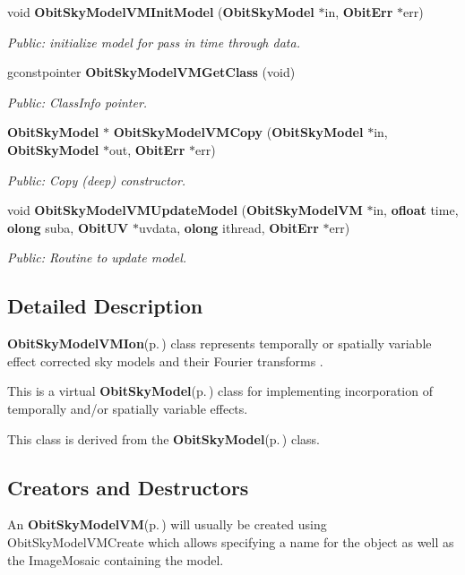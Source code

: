 \begin{CompactItemize}
void {\bf Obit\-Sky\-Model\-VMInit\-Model} ({\bf Obit\-Sky\-Model} $\ast$in, {\bf Obit\-Err} $\ast$err)
\begin{CompactList}\small\item\em Public: initialize model for pass in time through data. \item\end{CompactList}\item 
gconstpointer {\bf Obit\-Sky\-Model\-VMGet\-Class} (void)
\begin{CompactList}\small\item\em Public: Class\-Info pointer. \item\end{CompactList}\item 
{\bf Obit\-Sky\-Model} $\ast$ {\bf Obit\-Sky\-Model\-VMCopy} ({\bf Obit\-Sky\-Model} $\ast$in, {\bf Obit\-Sky\-Model} $\ast$out, {\bf Obit\-Err} $\ast$err)
\begin{CompactList}\small\item\em Public: Copy (deep) constructor. \item\end{CompactList}\item 
void {\bf Obit\-Sky\-Model\-VMUpdate\-Model} ({\bf Obit\-Sky\-Model\-VM} $\ast$in, {\bf ofloat} time, {\bf olong} suba, {\bf Obit\-UV} $\ast$uvdata, {\bf olong} ithread, {\bf Obit\-Err} $\ast$err)
\begin{CompactList}\small\item\em Public: Routine to update model. \item\end{CompactList}\end{CompactItemize}


\subsection{Detailed Description}
{\bf Obit\-Sky\-Model\-VMIon}{\rm (p.\,\pageref{structObitSkyModelVMIon})} class represents temporally or spatially variable effect corrected sky models and their Fourier transforms . 

This is a virtual {\bf Obit\-Sky\-Model}{\rm (p.\,\pageref{structObitSkyModel})} class for implementing incorporation of temporally and/or spatially variable effects.

This class is derived from the {\bf Obit\-Sky\-Model}{\rm (p.\,\pageref{structObitSkyModel})} class.\subsection{Creators and Destructors}\label{ObitSkyModelVM_8h_ObitSkyModelVMaccess}
An {\bf Obit\-Sky\-Model\-VM}{\rm (p.\,\pageref{structObitSkyModelVM})} will usually be created using Obit\-Sky\-Model\-VMCreate which allows specifying a name for the object as well as the Image\-Mosaic containing the model.

